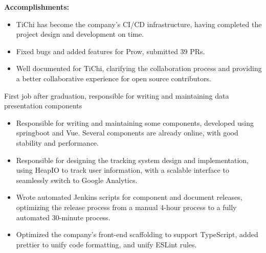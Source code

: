 \documentclass{resume}
\newcommand{\en}[1]{#1}
\newcommand{\zh}[1]{}
\begin{document}
\en{\textbf{Accomplishments:}}
\zh{\textbf{产出：}}
\begin{itemize}
      \item \en{TiChi has become the company's CI/CD infrastructure, having completed the project design and development on time.}
            \zh{按时完成了项目的设计和开发，TiChi 已经成为了公司 CI/CD 的基础设施。}
      \item \en{Fixed bugs and added features for Prow, submitted 39 PRs.}
            \zh{为 Prow 修复 bug 和添加功能，提交了 39 个 PR。}
      \item \en{Well documented for TiChi, clarifying the collaboration process and providing a better collaborative experience for open source contributors.}
            \zh{为 TiChi 编写了良好的文档，明确了协作流程，为开源贡献者提供了更好的协作体验。}
\end{itemize}

\en{}
\zh{\datedsubsection{\textbf{\href{https://www.morningstar.com/}{晨星资讯（Morningstar, Inc.）- 金融服务 - 前后端开发工程师}}}{2019/06 -- 2020/07}}
\en{First job after graduation, responsible for writing and maintaining data presentation components}
\zh{毕业后第一份工作，负责数据展示组件的编写和维护}
\begin{itemize}
      \item \en{Responsible for writing and maintaining some components, developed using springboot and Vue. Several components are already online, with good stability and performance.}
            \zh{负责独立组件的编写和维护，使用 springboot 和 Vue 开发。多个组件已经上线使用，有较好的稳定性和性能。}
      \item \en{Responsible for designing the tracking system design and implementation, using HeapIO to track user information, with a scalable interface to seamlessly switch to Google Analytics.}
            \zh{负责设计和实现前端 tracking 系统，使用 HeapIO 追踪用户信息，并预留可扩展接口，可无缝切换至 Google Analytics。}
      \item \en{Wrote automated Jenkins scripts for component and document releases, optimizing the release process from a manual 4-hour process to a fully automated 30-minute process.}
            \zh{为组件和文档发布编写了自动化 Jenkins 脚本，将发布流程从手动 4 小时优化到全自动 30 分钟。}
      \item \en{Optimized the company's front-end scaffolding to support TypeScript, added prettier to unify code formatting, and unify ESLint rules.}
            \zh{优化公司前端脚手架，使其支持 TypeScript，添加 prettier 统一代码格式，优化统一 ESLint 规则。}
\end{itemize}
\end{document}
